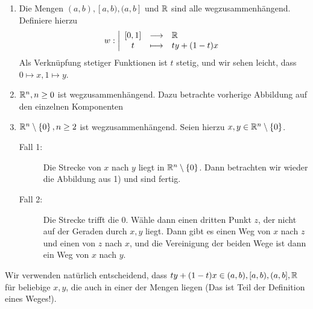 \begin{example}
    \begin{enumerate}[1)]
        \item  Die Mengen $(a,b), [a,b), (a,b]$ und $\mathbb{R}$ sind alle wegzusammenhängend. Definiere hierzu
        \begin{equation*}
        w: \left| \begin{array}{c c l} 
            [0,1] & \longrightarrow & \mathbb{R} \\
            t & \longmapsto &  ty + (1-t)x
        \end{array} \right.
    \end{equation*}
   Als Verknüpfung stetiger Funktionen ist $t$ stetig, und wir sehen leicht, dass  $0 \mapsto x, 1 \mapsto y$. 
   \item $\mathbb{R}^n, n\geq 0$ ist wegzusammenhängend. Dazu betrachte vorherige Abbildung auf den einzelnen Komponenten
   \item $\mathbb{R}^n \setminus \left \{0\right\} , n\geq 2$ ist wegzusammenhängend. Seien hierzu $x,y\in \mathbb{R}^n \setminus \left \{0\right\}$.
       \begin{description}
           \item[Fall 1:] Die Strecke von $x$ nach  $y$ liegt in  $\mathbb{R}^n \setminus \left \{0\right\}$. Dann betrachten wir wieder die Abbildung aus 1) und sind fertig.
           \item[Fall 2:] Die Strecke trifft die $0$. Wähle dann einen dritten Punkt $z$, der nicht auf der Geraden durch $x,y$ liegt. Dann gibt es einen Weg von $x$ nach  $z$ und einen von  $z$ nach  $x$, und die Vereinigung der beiden Wege ist dann ein Weg von  $x$ nach  $y$.
       \end{description}
    \end{enumerate}
\end{example}

\begin{remark*}
    Wir verwenden natürlich entscheidend, dass $ty + (1-t)x \in (a,b),[a,b),(a,b],\mathbb{R}$ für beliebige $x,y$, die auch in einer der Mengen liegen (Das ist Teil der Definition eines Weges!).
\end{remark*}


